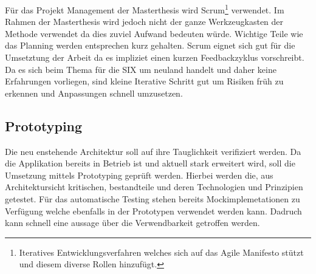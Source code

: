 Für das Projekt Management der Masterthesis wird Scrum\footnote{Iteratives Entwicklungsverfahren welches sich auf das Agile Manifesto stützt und diesem diverse Rollen hinzufügt. } verwendet. Im Rahmen der Masterthesis wird jedoch nicht der ganze Werkzeugkasten der Methode verwendet da dies zuviel Aufwand bedeuten würde. Wichtige Teile wie das Planning werden entsprechen kurz gehalten.
Scrum eignet sich gut für die Umsetztung der Arbeit da es impliziet einen kurzen Feedbackzyklus vorschreibt. Da es sich beim Thema für die SIX um neuland handelt und daher keine Erfahrungen vorliegen, sind kleine Iterative Schritt gut um Risiken früh zu erkennen und Anpassungen schnell umzusetzen.

\subsection{Prototyping}
Die neu enstehende Architektur soll auf ihre Tauglichkeit verifiziert werden. Da die Applikation bereits in Betrieb ist und aktuell stark erweitert wird, soll die Umsetzung mittels Prototyping geprüft werden. Hierbei werden die, aus Architektursicht kritischen, bestandteile und deren Technologien und Prinzipien getestet. Für das automatische Testing stehen bereits Mockimplemetationen zu Verfügung welche ebenfalls in der Prototypen verwendet werden kann. Dadruch kann schnell eine aussage über die Verwendbarkeit getroffen werden. 
